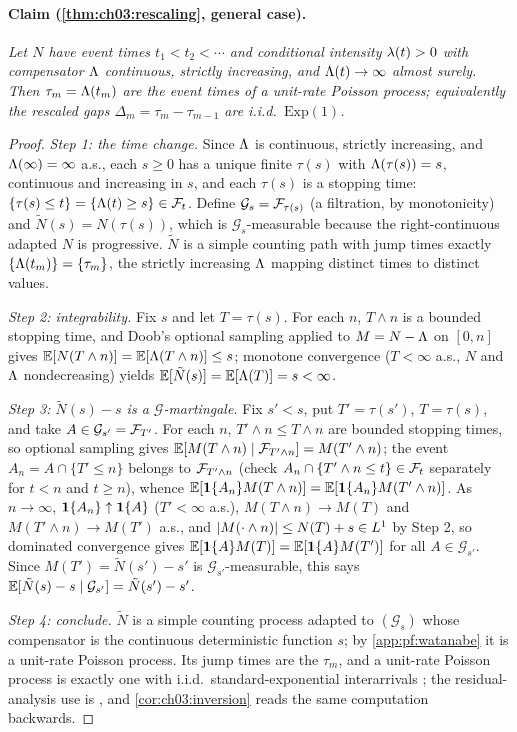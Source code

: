 \paragraph{Claim (\cref{thm:ch03:rescaling}, general case).}
\emph{Let $N$ have event times $t_1 < t_2 < \cdots$ and conditional intensity $\lambda(t) > 0$ with
compensator $\Lambda$ continuous, strictly increasing, and $\Lambda(t) \to \infty$ almost surely. Then
$\tau_m = \Lambda(t_m)$ are the event times of a unit-rate Poisson process; equivalently the rescaled
gaps $\Delta_m = \tau_m - \tau_{m-1}$ are i.i.d.\ $\mathrm{Exp}(1)$.}
\begin{proof}
\emph{Step 1: the time change.} Since $\Lambda$ is continuous, strictly increasing, and $\Lambda(\infty) =
\infty$ a.s., each $s \ge 0$ has a unique finite $\tau(s)$ with $\Lambda(\tau(s)) = s$, continuous and
increasing in $s$, and each $\tau(s)$ is a stopping time: $\{\tau(s) \le t\} = \{\Lambda(t) \ge s\} \in
\mathcal{F}_{t}$. Define $\mathcal{G}_s = \mathcal{F}_{\tau(s)}$ (a filtration, by monotonicity) and $\tilde N(s) =
N(\tau(s))$, which is $\mathcal{G}_s$-measurable because the right-continuous adapted $N$ is
progressive. $\tilde N$ is a simple counting path with jump times exactly $\{\Lambda(t_m)\} =
\{\tau_m\}$, the strictly increasing $\Lambda$ mapping distinct times to distinct values.

\emph{Step 2: integrability.} Fix $s$ and let $T = \tau(s)$. For each $n$, $T \wedge n$ is a bounded
stopping time, and Doob's optional sampling applied to $M = N - \Lambda$ on $[0,n]$ gives $\mathbb{E}[N(T \wedge
n)] = \mathbb{E}[\Lambda(T \wedge n)] \le s$; monotone convergence ($T < \infty$ a.s., $N$ and $\Lambda$
nondecreasing) yields $\mathbb{E}[\tilde N(s)] = \mathbb{E}[\Lambda(T)] = s < \infty$.

\emph{Step 3: $\tilde N(s) - s$ is a $\mathcal{G}$-martingale.} Fix $s' < s$, put $T' = \tau(s')$, $T
= \tau(s)$, and take $A \in \mathcal{G}_{s'} = \mathcal{F}_{T'}$. For each $n$, $T' \wedge n \le T \wedge n$
are bounded stopping times, so optional sampling gives $\mathbb{E}[M(T \wedge n) \mid \mathcal{F}_{T' \wedge n}] = M(T'
\wedge n)$; the event $A_n = A \cap \{T' \le n\}$ belongs to $\mathcal{F}_{T' \wedge n}$ (check $A_n \cap \{T'
\wedge n \le t\} \in \mathcal{F}_{t}$ separately for $t < n$ and $t \ge n$), whence $\mathbb{E}[\mathbf{1}\{A_n\} M(T \wedge n)] =
\mathbb{E}[\mathbf{1}\{A_n\} M(T' \wedge n)]$. As $n \to \infty$, $\mathbf{1}\{A_n\} \uparrow \mathbf{1}\{A\}$ ($T' < \infty$ a.s.),
$M(T \wedge n) \to M(T)$ and $M(T' \wedge n) \to M(T')$ a.s., and $\left|M(\cdot \wedge n)\right| \le N(T) +
s \in L^1$ by Step 2, so dominated convergence gives $\mathbb{E}[\mathbf{1}\{A\} M(T)] = \mathbb{E}[\mathbf{1}\{A\} M(T')]$ for all $A
\in \mathcal{G}_{s'}$. Since $M(T') = \tilde N(s') - s'$ is $\mathcal{G}_{s'}$-measurable, this says
$\mathbb{E}[\tilde N(s) - s \mid \mathcal{G}_{s'}] = \tilde N(s') - s'$.

\emph{Step 4: conclude.} $\tilde N$ is a simple counting process adapted to $(\mathcal{G}_s)$ whose
compensator is the continuous deterministic function $s$; by \cref{app:pf:watanabe} it is a unit-rate
Poisson process. Its jump times are the $\tau_m$, and a unit-rate Poisson process is exactly one with
i.i.d.\ standard-exponential interarrivals \citep[Ch.~2]{daley2003}; the residual-analysis use is
\citet{ogata1988}, and \cref{cor:ch03:inversion} reads the same computation backwards.
\end{proof}
